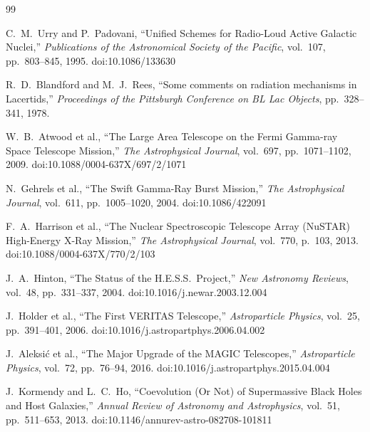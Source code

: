 \documentclass[11pt]{article}
\begin{document}
\begin{thebibliography}{99}

C.~M.~Urry and P.~Padovani,
``Unified Schemes for Radio-Loud Active Galactic Nuclei,''
\textit{Publications of the Astronomical Society of the Pacific}, vol.~107, pp.~803--845, 1995.
doi:10.1086/133630

R.~D.~Blandford and M.~J.~Rees,
``Some comments on radiation mechanisms in Lacertids,''
\textit{Proceedings of the Pittsburgh Conference on BL Lac Objects}, pp.~328--341, 1978.

W.~B.~Atwood et al.,
``The Large Area Telescope on the Fermi Gamma-ray Space Telescope Mission,''
\textit{The Astrophysical Journal}, vol.~697, pp.~1071--1102, 2009.
doi:10.1088/0004-637X/697/2/1071

N.~Gehrels et al.,
``The Swift Gamma-Ray Burst Mission,''
\textit{The Astrophysical Journal}, vol.~611, pp.~1005--1020, 2004.
doi:10.1086/422091

F.~A.~Harrison et al.,
``The Nuclear Spectroscopic Telescope Array (NuSTAR) High-Energy X-Ray Mission,''
\textit{The Astrophysical Journal}, vol.~770, p.~103, 2013.
doi:10.1088/0004-637X/770/2/103

J.~A.~Hinton,
``The Status of the H.E.S.S.\ Project,''
\textit{New Astronomy Reviews}, vol.~48, pp.~331--337, 2004.
doi:10.1016/j.newar.2003.12.004

J.~Holder et al.,
``The First VERITAS Telescope,''
\textit{Astroparticle Physics}, vol.~25, pp.~391--401, 2006.
doi:10.1016/j.astropartphys.2006.04.002

J.~Aleksi\'c et al.,
``The Major Upgrade of the MAGIC Telescopes,''
\textit{Astroparticle Physics}, vol.~72, pp.~76--94, 2016.
doi:10.1016/j.astropartphys.2015.04.004

J.~Kormendy and L.~C.~Ho,
``Coevolution (Or Not) of Supermassive Black Holes and Host Galaxies,''
\textit{Annual Review of Astronomy and Astrophysics}, vol.~51, pp.~511--653, 2013.
doi:10.1146/annurev-astro-082708-101811

\end{thebibliography}
\end{document}
